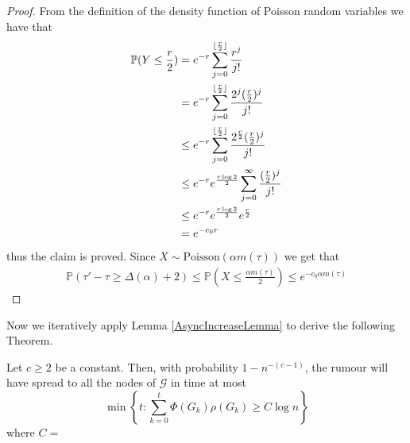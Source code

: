 \begin{proof}
	\noindent
	From the definition of the density function of Poisson random variables we have that 
	\begin{align*}
		\mathbb{P}(Y \leq \frac{r}{2}) & = e^{-r} \sum_{j=0}^{\lfloor\frac{r}{2}\rfloor} \frac{r^j}{j!} \\
		& = e^{-r} \sum_{j=0}^{\lfloor\frac{r}{2}\rfloor} \frac{2^j(\frac{r}{2})^j}{j!} \\
		& \leq e^{-r} \sum_{j=0}^{\lfloor\frac{r}{2}\rfloor} \frac{2^\frac{r}{2}(\frac{r}{2})^j}{j!} \\
		& \leq e^{-r} e^\frac{r \log 2}{2} \sum_{j=0}^\infty \frac{(\frac{r}{2})^j}{j!} \\
		& \leq e^{-r} e^\frac{r \log 2}{2} e^\frac{r}{2} \\
		& = e^{-c_0r} \\
	\end{align*}
	thus the claim is proved. Since $X \sim \text{Poisson}(\alpha m(\tau))$ we get that
	\begin{align*}
		\mathbb{P}(\tau' - \tau \geq \Delta(\alpha) + 2) \leq \mathbb{P}(X \leq \frac{\alpha m(\tau)}{2}) \leq e^{-c_0 \alpha m(\tau)}
	\end{align*}	
\end{proof}

Now we iteratively apply Lemma \ref{AsyncIncreaseLemma} to derive the following Theorem.

\begin{theorem}\label{theorem:AsyncUpperBound}
	\ModelIntro Let $c \geq 2$ be a constant. Then, with probability $1 - n^{-(c-1)}$, the rumour will have spread to all the nodes of $\mathcal{G}$ in time at most
	$$
		\min \left\{t : \sum_{k=0}^t \Phi(G_k)\rho(G_k) \geq C \log n \right\} 
	$$
	where $C = $ %
\end{theorem}

